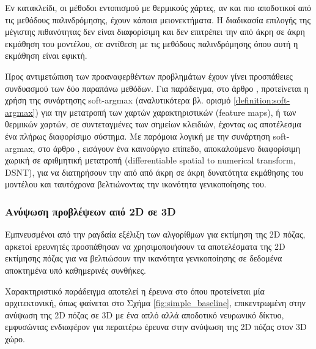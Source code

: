 Εν κατακλείδι, οι μέθοδοι εντοπισμού με θερμικούς χάρτες, αν και πιο αποδοτικοί από τις μεθόδους παλινδρόμησης, έχουν κάποια μειονεκτήματα. Η διαδικασία επιλογής της μέγιστης πιθανότητας δεν είναι διαφορίσιμη και δεν επιτρέπει την από άκρη σε άκρη εκμάθηση του μοντέλου, σε αντίθεση με τις μεθόδους παλινδρόμησης όπου αυτή η εκμάθηση είναι εφικτή.

Προς αντιμετώπιση των προαναφερθέντων προβλημάτων έχουν γίνει προσπάθειες συνδυασμού των δύο παραπάνω μεθόδων. Για παράδειγμα, στο άρθρο \cite{human_pose_regression_paper}, προτείνεται η χρήση της συνάρτησης soft-argmax (αναλυτικότερα βλ. ορισμό \ref{definition:soft-argmax}) για την μετατροπή των χαρτών χαρακτηριστικών (feature maps), ή των θερμικών χαρτών, σε συντεταγμένες των σημείων κλειδιών, έχοντας ως αποτέλεσμα ένα πλήρως διαφορίσιμο σύστημα. Με παρόμοια λογική με την συνάρτηση soft-argmax, στο άρθρο \cite{numerical_coordinate_regression_paper}, εισάγουν ένα καινούργιο επίπεδο, αποκαλούμενο διαφορίσιμη χωρική σε αριθμητική μετατροπή (differentiable spatial to numerical transform, DSNT), για να διατηρήσουν την από από άκρη σε άκρη δυνατότητα εκμάθησης του μοντέλου και ταυτόχρονα βελτιώνοντας την ικανότητα γενικοποίησης του. 

\subsubsection{Ανύψωση προβλέψεων από 2D σε 3D }

Εμπνευσμένοι από την ραγδαία εξέλιξη των αλγορίθμων για εκτίμηση της 2D πόζας, αρκετοί ερευνητές προσπάθησαν να χρησιμοποιήσουν τα αποτελέσματα της 2D εκτίμησης πόζας για να βελτιώσουν την ικανότητα γενικοποίησης σε δεδομένα αποκτημένα υπό καθημερινές συνθήκες. 

Χαρακτηριστικό παράδειγμα αποτελεί η έρευνα στο \cite{simple_baseline_pose_estimation} όπου προτείνεται μία αρχιτεκτονική, όπως φαίνεται στο Σχήμα \ref{fig:simple_baseline}, επικεντρωμένη στην ανύψωση της 2D πόζας σε 3D με ένα απλό αλλά αποδοτικό νευρωνικό δίκτυο, εμφυσώντας ενδιαφέρον για περαιτέρω έρευνα στην ανύψωση της 2D πόζας στον 3D χώρο.

